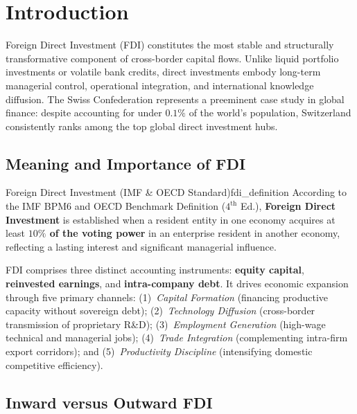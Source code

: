 
\section{Introduction}

Foreign Direct Investment (FDI) constitutes the most stable and structurally transformative component of cross-border capital flows. Unlike liquid portfolio investments or volatile bank credits, direct investments embody long-term managerial control, operational integration, and international knowledge diffusion. The Swiss Confederation represents a preeminent case study in global finance: despite accounting for under $0.1\%$ of the world's population, Switzerland consistently ranks among the top global direct investment hubs.

\subsection{Meaning and Importance of FDI}

\begin{definition}{Foreign Direct Investment (IMF \& OECD Standard)}{fdi_definition}
According to the IMF BPM6 and OECD Benchmark Definition ($4^{\text{th}}$ Ed.), \textbf{Foreign Direct Investment} is established when a resident entity in one economy acquires at least \textbf{$10\%$ of the voting power} in an enterprise resident in another economy, reflecting a lasting interest and significant managerial influence.
\end{definition}

FDI comprises three distinct accounting instruments: \textbf{equity capital}, \textbf{reinvested earnings}, and \textbf{intra-company debt}. It drives economic expansion through five primary channels: (1)~\textit{Capital Formation} (financing productive capacity without sovereign debt); (2)~\textit{Technology Diffusion} (cross-border transmission of proprietary R\&D); (3)~\textit{Employment Generation} (high-wage technical and managerial jobs); (4)~\textit{Trade Integration} (complementing intra-firm export corridors); and (5)~\textit{Productivity Discipline} (intensifying domestic competitive efficiency).

\subsection{Inward versus Outward FDI}

